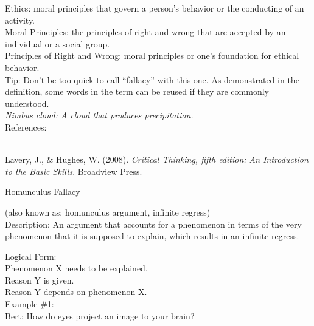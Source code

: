\documentclass[a4paper,12pt,single,pdftex]{scrartcl}
\begin{document}
    
      Ethics: moral principles that govern a person's behavior or the conducting of an activity.
    \\

    
      Moral Principles: the principles of right and wrong that are accepted by an individual or a social group.
    \\

    
      Principles of Right and Wrong: moral principles or one's foundation for ethical behavior.
    \\

    
      Tip: Don’t be too quick to call “fallacy” with this one. As demonstrated in the definition, some words in the term can be reused if they are commonly understood.
    \\

    
      {\em Nimbus cloud: A cloud that produces precipitation.}
    \\

    References:

    
      
        
      \\

      
        
          Lavery, J., \& Hughes, W. (2008). {\it Critical Thinking, fifth edition: An Introduction to the Basic Skills}. Broadview Press.
        
      
    
  

Homunculus Fallacy
    
      (also known as: homunculus argument, infinite regress)
    \\

  
    Description: An argument that accounts for a phenomenon in terms of the very phenomenon that it is supposed to explain, which results in an infinite regress.

    
      Logical Form:
    \\

    
      Phenomenon X needs to be explained.
    \\

    
      Reason Y is given.
    \\

    
      Reason Y depends on phenomenon X.
    \\

    
      Example \#1:
    \\

    
      Bert: How do eyes project an image to your brain?
    \\
\end{document}

